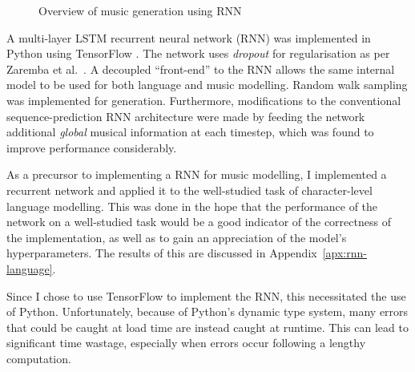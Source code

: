 \documentclass[12pt,a4paper,twoside,openright]{report}
\begin{document}
\begin{figure}[H]
\centering
{}
\caption{Overview of music generation using RNN}
\label{fig:rnn-gen-overview}
\end{figure}

A multi-layer LSTM recurrent neural network (RNN) was implemented in Python
using TensorFlow \cite{abadi2016tensorflow}. The network uses \emph{dropout} for
regularisation as per Zaremba et al.\ \cite{zaremba2014recurrent}. A decoupled
``front-end'' to the RNN allows the same internal model to be used for both
language and music modelling. Random walk sampling was implemented for
generation. Furthermore, modifications to the conventional sequence-prediction
RNN architecture were made by feeding the network additional \emph{global}
musical information at each timestep, which was found to improve performance
considerably.

As a precursor to implementing a RNN for music modelling, I implemented a
recurrent network and applied it to the well-studied task of character-level
language modelling. This was done in the hope that the performance of the
network on a well-studied task would be a good indicator of the correctness of
the implementation, as well as to gain an appreciation of the model's
hyperparameters. The results of this are discussed in
Appendix~\ref{apx:rnn-language}.

Since I chose to use TensorFlow to implement the RNN, this necessitated the use
of Python. Unfortunately, because of Python's dynamic type system, many errors
that could be caught at load time are instead caught at runtime. This can lead
to significant time wastage, especially when errors occur following a lengthy
computation. 
\end{document}
